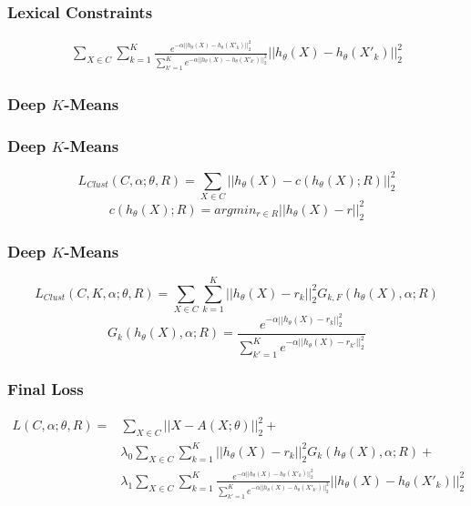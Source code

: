 \documentclass{beamer}
\begin{document}
\begin{frame}
\frametitle{Lexical Constraints}
\begin{equation*}
\begin{array}{l}
  \sum\limits_{X \in C} \sum\limits_{k = 1}^K \frac{e^{-\alpha|| h_\theta(X) - 
h_\theta(X'_k)||_2^2}}{\sum\limits_{k' = 1}^K e^{-\alpha|| h_\theta(X) - 
h_\theta(X'_{k'})||_2^2}}|| h_\theta(X) - h_\theta(X'_{k})||_2^2
\end{array}
\end{equation*}
\end{frame}

\begin{frame}
  \frametitle{Deep $K$-Means }
\end{frame}

\begin{frame}
  \frametitle{Deep $K$-Means }
\begin{equation*}
  L_{Clust}(C,\alpha;\theta,R) = \sum_{X \in C} ||h_\theta(X)-c(h_\theta(X); R)||_2^2
\end{equation*}
\begin{equation*}
  c(h_\theta(X); R) = argmin_{r \in R}||h_\theta(X) - r||_2^2
\end{equation*}
\end{frame}

\begin{frame}
  \frametitle{Deep $K$-Means }
\begin{equation*}
L_{Clust}(C, K, \alpha; \theta, R) = \sum_{X \in C} \sum_{k=1}^K ||h_{\theta}(X) - r_k||_2^2 G_{k, F}(h_{\theta}(X), \alpha; R)
\end{equation*}
\begin{equation*}
G_{k}(h_\theta(X), \alpha; R) = \frac{e^{-\alpha ||h_\theta(X) - r_k||_2^2}}
{\sum\limits_{k' = 1}^K e^{-\alpha ||h_\theta(X) - r_{k'}||_2^2}}
\end{equation*}
\end{frame}

\begin{frame}
  \frametitle{Final Loss}
  \begin{equation*}
    \begin{array}{ll}
      L(C ,\alpha;\theta,R) = & \sum\limits_{X \in C} ||X - A(X;\theta)||_2^2 + 
      \\ & \lambda_0 \sum\limits_{X \in C}\sum\limits_{k=1}^K||h_\theta(X) - r_k ||_2^2 G_{k}(h_\theta(X), \alpha; R) + 
      \\ & \lambda_1\sum\limits_{X \in C} \sum\limits_{k = 1}^K \frac{e^{-\alpha|| h_\theta(X) - 
          h_\theta(X'_k)||_2^2}}{\sum\limits_{k' = 1}^K e^{-\alpha|| h_\theta(X) - 
          h_\theta(X'_{k'})||_2^2}}|| h_\theta(X) - h_\theta(X'_{k})||_2^2
    \end{array}
  \end{equation*}
\end{frame}
\end{document}
